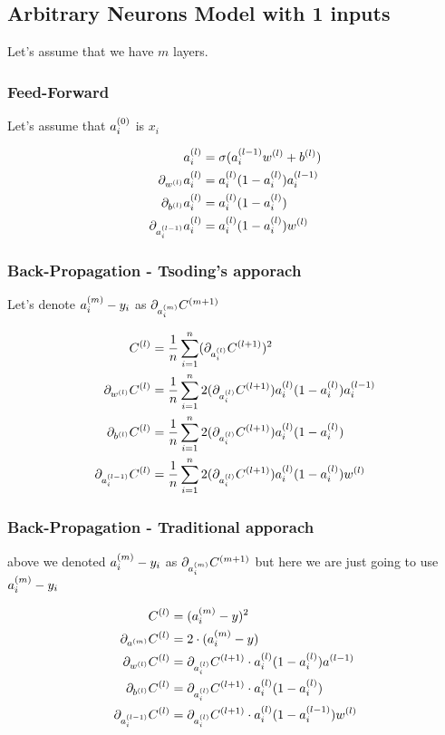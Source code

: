 \documentclass{article}
\begin{document}
\subsection{Arbitrary Neurons Model with 1 inputs}

Let's assume that we have $m$ layers.

\subsubsection{Feed-Forward}

Let's assume that $a_i\s[0]$ is $x_i$

\begin{align}
    a_i\s[l] &= \sigma(a_i\s[l-1]w\s[l] + b\s[l]) \\
    \pd[{w\s[l]}]a_i\s[l] &= a_i\s[l](1 - a_i\s[l])a_i\s[l-1] \\
    \pd[{b\s[l]}]a_i\s[l] &= a_i\s[l](1 - a_i\s[l]) \\
    \pd[{a_i\s[l-1]}]a_i\s[l] &= a_i\s[l](1 - a_i\s[l])w\s[l] \\
\end{align}

\subsubsection{Back-Propagation - Tsoding's apporach}

Let's denote $a_i\s[m] - y_i$ as $\pd[{a_i\s[m]}]C\s[m+1]$

\begin{align}
    C\s[l]
        &= \avgsum[i, n] (\pd[{a_i\s[l]}]C\s[l+1])^2 \\
    \pd[{w\s[l]}]C\s[l]
        &= \avgsum[i, n] 2(\pd[{a_i\s[l]}]C\s[l+1]) a_i\s[l](1 - a_i\s[l])a_i\s[l-1] \\
    \pd[{b\s[l]}]C\s[l]
        &= \avgsum[i, n] 2(\pd[{a_i\s[l]}]C\s[l+1]) a_i\s[l](1 - a_i\s[l]) \\
    \pd[{a_i\s[l-1]}] C\s[l]
        &= \avgsum[i, n] 2(\pd[{a_i\s[l]}]C\s[l+1])a_i\s[l](1 - a_i\s[l])w\s[l]
\end{align}

\subsubsection{Back-Propagation - Traditional apporach}

above we denoted $a_i\s[m] - y_i$ as $\pd[{a_i\s[m]}]C\s[m+1]$ but here we are just going to use $a_i\s[m] - y_i$

\begin{align}
    C\s[l]
        &= (a_i\s[m] - y)^2\\
    \pd[{a\s[m]}]C\s[l]
        &= 2 \cdot (a_i\s[m] - y)\\
    \pd[{w\s[l]}]C\s[l]
        &= \pd[{a_i\s[l]}]C\s[l+1] \cdot a_i\s[l](1 - a_i\s[l])a\s[l-1] \\
    \pd[{b\s[l]}]C\s[l]
        &= \pd[{a_i\s[l]}]C\s[l+1] \cdot a_i\s[l](1 - a_i\s[l]) \\
    \pd[{a_i\s[l-1]}] C\s[l]
        &= \pd[{a_i\s[l]}]C\s[l+1] \cdot a_i\s[l](1 - a_i\s[l-1])w\s[l] \\
\end{align}
\end{document}
